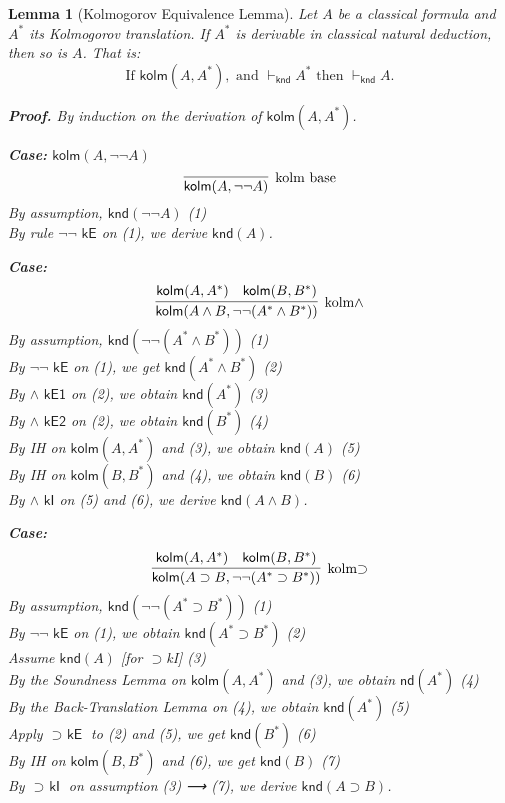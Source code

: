 \documentclass{article}
\newtheorem{lemma}{Lemma}
\begin{document}
    \begin{lemma}[Kolmogorov Equivalence Lemma]
    \label{lem:equiv}
    Let $A$ be a classical formula and $A^*$ its Kolmogorov translation. If $A^*$ is derivable in classical natural deduction, then so is $A$. That is:
    \[
    \text{If } \textsf{kolm}(A, A^*), \text{ and } \vdash_{\textsf{knd}} A^* \text{ then } \vdash_{\textsf{knd}} A.
    \]
    
    \textbf{Proof.}  
    By induction on the derivation of $\textsf{kolm}(A, A^*)$.
    
    \medskip

    \noindent \textbf{Case:} $\textsf{kolm}(A, \neg\neg A)$  
    \[
    \infer[\text{kolm base}]{\textsf{kolm}(A, \neg\neg A)}{}
    \]
    By assumption, $\textsf{knd}(\neg\neg A)$ \hfill (1)\\
    By rule $\textsf{$\neg\neg$ kE}$ on (1), we derive $\textsf{knd}(A)$.
    
    \medskip
    
    \noindent \textbf{Case:} 
    \[
    \infer[\text{kolm$\wedge$}]{\textsf{kolm}(A \wedge B, \neg\neg (A^* \wedge B^*))}{
      \textsf{kolm}(A, A^*) \quad \textsf{kolm}(B, B^*)
    }
    \]
    By assumption, $\textsf{knd}(\neg\neg (A^* \wedge B^*))$ \hfill (1)\\
    By $\textsf{$\neg\neg$ kE}$ on (1), we get $\textsf{knd}(A^* \wedge B^*)$ \hfill (2)\\
    By $\textsf{$\wedge$ kE1}$ on (2), we obtain $\textsf{knd}(A^*)$ \hfill (3)\\
    By $\textsf{$\wedge$ kE2}$ on (2), we obtain $\textsf{knd}(B^*)$ \hfill (4)\\
    By IH on $\textsf{kolm}(A, A^*)$ and (3), we obtain $\textsf{knd}(A)$ \hfill (5)\\
    By IH on $\textsf{kolm}(B, B^*)$ and (4), we obtain $\textsf{knd}(B)$ \hfill (6)\\
    By $\textsf{$\wedge$ kI}$ on (5) and (6), we derive $\textsf{knd}(A \wedge B)$.
    
    \medskip
    
    \noindent \textbf{Case:} 
    \[
    \infer[\text{kolm$\supset$}]{\textsf{kolm}(A \supset B, \neg\neg (A^* \supset B^*))}{
      \textsf{kolm}(A, A^*) \quad \textsf{kolm}(B, B^*)
    }
    \]
    By assumption, $\textsf{knd}(\neg\neg (A^* \supset B^*))$ \hfill (1)\\
    By $\textsf{$\neg\neg$ kE}$ on (1), we obtain $\textsf{knd}(A^* \supset B^*)$ \hfill (2)\\
    Assume $\textsf{knd}(A)$ [for $\supset$kI] \hfill (3)\\
    By the Soundness Lemma on $\textsf{kolm}(A, A^*)$ and (3), we obtain $\textsf{nd}(A^*)$ \hfill (4)\\
    By the Back-Translation Lemma on (4), we obtain $\textsf{knd}(A^*)$ \hfill (5)\\
    Apply $\textsf{$\supset$ kE}$ to (2) and (5), we get $\textsf{knd}(B^*)$ \hfill (6)\\
    By IH on $\textsf{kolm}(B, B^*)$ and (6), we get $\textsf{knd}(B)$ \hfill (7)\\
    By $\textsf{$\supset$ kI}$ on assumption (3) ⟶ (7), we derive $\textsf{knd}(A \supset B)$.
    

\end{lemma}
\end{document}
